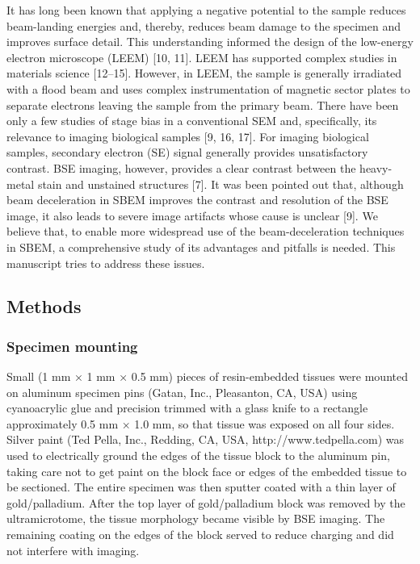 \documentclass{article}
\begin{document}
It has long been known that applying a negative potential to the sample reduces beam-landing energies and, thereby, reduces beam damage to the specimen and improves surface detail. This understanding informed the design of the low-energy electron microscope (LEEM) [10, 11]. LEEM has supported complex studies in materials science [12–15]. However, in LEEM, the sample is generally irradiated with a flood beam and uses complex instrumentation of magnetic sector plates to separate electrons leaving the sample from the primary beam. There have been only a few studies of stage bias in a conventional SEM and, specifically, its relevance to imaging biological samples [9, 16, 17]. For imaging biological samples, secondary electron (SE) signal generally provides unsatisfactory contrast. BSE imaging, however, provides a clear contrast between the heavy-metal stain and unstained structures [7]. It was been pointed out that, although beam deceleration in SBEM improves the contrast and resolution of the BSE image, it also leads to severe image artifacts whose cause is unclear [9]. We believe that, to enable more widespread use of the beam-deceleration techniques in SBEM, a comprehensive study of its advantages and pitfalls is needed. This manuscript tries to address these issues.

\subsection*{Methods}
\subsubsection*{Specimen mounting}
Small (1 mm × 1 mm × 0.5 mm) pieces of resin-embedded tissues were mounted on aluminum specimen pins (Gatan, Inc., Pleasanton, CA, USA) using cyanoacrylic glue and precision trimmed with a glass knife to a rectangle approximately 0.5 mm × 1.0 mm, so that tissue was exposed on all four sides. Silver paint (Ted Pella, Inc., Redding, CA, USA, http://www.tedpella.com) was used to electrically ground the edges of the tissue block to the aluminum pin, taking care not to get paint on the block face or edges of the embedded tissue to be sectioned. The entire specimen was then sputter coated with a thin layer of gold/palladium. After the top layer of gold/palladium block was removed by the ultramicrotome, the tissue morphology became visible by BSE imaging. The remaining coating on the edges of the block served to reduce charging and did not interfere with imaging.
\end{document}
